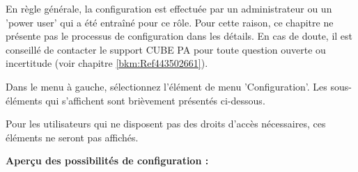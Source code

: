 En règle générale, la configuration est effectuée par un administrateur ou un 'power user' qui a été entraîné pour ce rôle. Pour cette raison, ce chapitre ne présente pas le processus de configuration dans les détails. En cas de doute, il est conseillé de contacter le support CUBE PA pour toute question ouverte ou incertitude (voir chapitre \ref{bkm:Ref443502661}).

\vspace{\baselineskip}

Dans le menu à gauche, sélectionnez l'élément de menu 'Configuration'. Les sous-éléments qui s'affichent sont brièvement présentés ci-dessous.

\vspace{1.5cm} 

Pour les utilisateurs qui ne disposent pas des droits d'accès nécessaires, ces éléments ne seront pas affichés.
\vspace{3.5cm}  

\textbf{Aperçu des possibilités de configuration :}

\vspace{\baselineskip}

